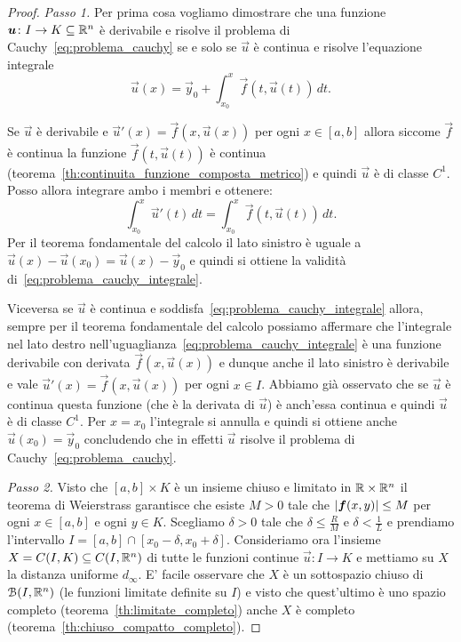 \begin{proof}
  \emph{Passo 1.}
  Per prima cosa vogliamo dimostrare che una funzione $\boldsymbol u\colon I\to K\subseteq {\mathbb R}^n$
  è derivabile e risolve il problema di Cauchy~\eqref{eq:problema_cauchy} 
  se e solo se 
  $\vec u$ è continua e risolve l'equazione integrale
  \begin{equation}\label{eq:problema_cauchy_integrale}
  \vec u(x) = \vec y_0 + \int_{x_0}^x \vec f(t,\vec u(t))\, dt.
  \end{equation}

  Se $\vec u$ è derivabile e 
  $\vec u'(x) = \vec f(x, \vec u(x))$ per ogni $x\in[a,b]$ allora 
  siccome $\vec f$ è continua la funzione $\vec f(t,\vec u(t))$ è continua 
  (teorema~\ref{th:continuita_funzione_composta_metrico})
  e quindi $\vec u$ è di classe $C^1$. 
  Posso allora integrare ambo i membri 
  e ottenere:
  \[
   \int_{x_0}^x \vec u'(t)\, dt = \int_{x_0}^x \vec f(t,\vec u(t))\, dt.  
  \]
  Per il teorema fondamentale del calcolo il lato sinistro è uguale 
  a $\vec u(x) - \vec u(x_0) = \vec u(x) - \vec y_0$ e quindi si ottiene 
  la validità di~\eqref{eq:problema_cauchy_integrale}.

  Viceversa se $\vec u$ è continua e soddisfa~\eqref{eq:problema_cauchy_integrale}
  allora, sempre per il teorema fondamentale del calcolo possiamo affermare
  che l'integrale nel lato destro nell'uguaglianza~\eqref{eq:problema_cauchy_integrale}
  è una funzione derivabile con derivata $\vec f(x,\vec u(x))$ e dunque anche 
  il lato sinistro è derivabile e vale $\vec u'(x) = \vec f(x,\vec u(x))$ per 
  ogni $x\in I$. 
  Abbiamo già osservato che se $\vec u$ è continua questa funzione (che è la derivata 
  di $\vec u$) è anch'essa continua e quindi $\vec u$ è di classe $C^1$.
  Per $x=x_0$ l'integrale si annulla e quindi si ottiene 
  anche $\vec u(x_0) = \vec y_0$ concludendo che in effetti $\vec u$ risolve 
  il problema di Cauchy~\eqref{eq:problema_cauchy}.

  \emph{Passo 2.}
  Visto che $[a,b]\times K$ è un insieme chiuso e limitato in ${\mathbb R} \times {\mathbb R}^n$ 
  il teorema di Weierstrass garantisce che esiste $M>0$ tale che 
  ${\left|\boldsymbol f(x,y)\right|}\le M$ per ogni $x\in [a,b]$ e ogni $y\in K$.
  Scegliamo $\delta >0$ tale che $\delta \le \frac{R}{M}$ e $\delta < \frac {1}{L}$
  e prendiamo l'intervallo $I = [a,b]\cap [x_0-\delta,x_0+\delta]$.
  Consideriamo ora l'insieme $X=C(I,K)\subseteq C(I,{\mathbb R}^n)$ di tutte le funzioni continue $\vec u\colon I\to K$
  e mettiamo su $X$ la distanza uniforme $d_\infty$.
  E' facile osservare che $X$ è un sottospazio chiuso di $\mathcal B(I,{\mathbb R}^n)$ (le funzioni limitate definite su $I$)
  e visto che quest'ultimo è uno spazio completo (teorema~\ref{th:limitate_completo}) anche $X$ 
  è completo (teorema~\ref{th:chiuso_compatto_completo}).


\end{proof}
